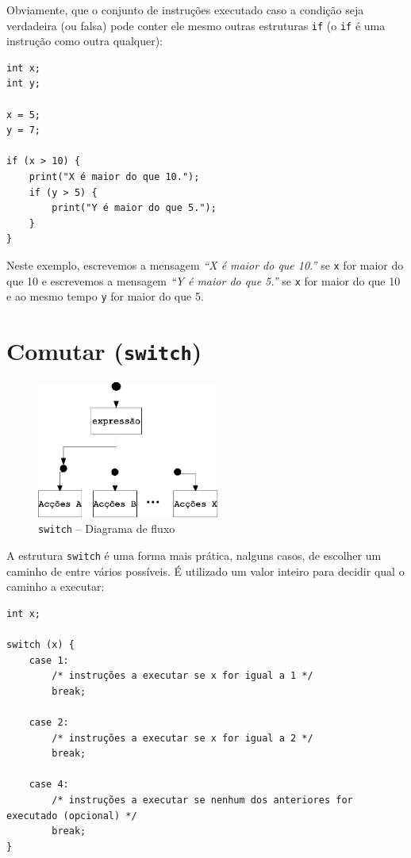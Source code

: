 Obviamente, que o conjunto de instruções executado caso a condição seja verdadeira (ou falsa) pode conter ele mesmo outras estruturas \texttt{if} (o \texttt{if} é uma instrução como outra qualquer):
\begin{lstlisting}
int x;
int y;

x = 5;
y = 7;

if (x > 10) {
    print("X é maior do que 10.");
    if (y > 5) {
        print("Y é maior do que 5.");
    }
} 
\end{lstlisting}
Neste exemplo, escrevemos a mensagem \emph{``X é maior do que 10.''} se \texttt{x} for maior do que 10 e escrevemos a mensagem 
\emph{``Y é maior do que 5.''} se \texttt{x} for maior do que 10 e ao mesmo tempo \texttt{y} for maior do que 5.

\section{Comutar (\texttt{switch})}

\begin{figure}[!h]
	\centering
		\includegraphics[width=6cm]{images/comuta.eps}
	\caption{\texttt{switch} -- Diagrama de fluxo}
	\label{fig:comuta}
\end{figure}

A estrutura \texttt{switch} é uma forma mais prática, nalguns casos, de escolher um
caminho de entre vários possíveis. É utilizado um valor inteiro para decidir
qual o caminho a executar:
\begin{lstlisting}
int x;

switch (x) {
    case 1: 
        /* instruções a executar se x for igual a 1	*/
        break;
	
    case 2: 
        /* instruções a executar se x for igual a 2	*/
        break;
	
    case 4: 
        /* instruções a executar se nenhum dos anteriores for executado	(opcional) */
        break;	    
}
\end{lstlisting}


